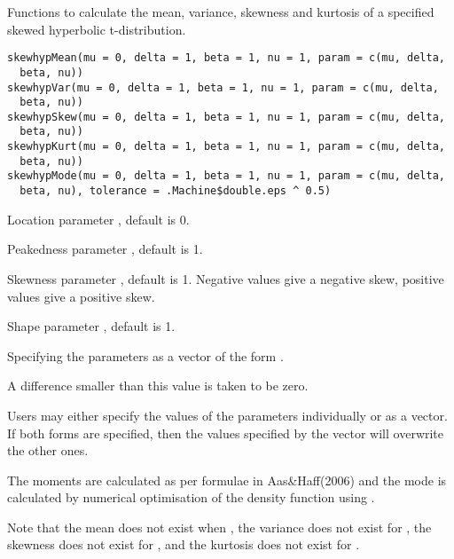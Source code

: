 \documentclass{book}
\begin{document}
\begin{Description}\relax
Functions to calculate the mean, variance, skewness and kurtosis of a
specified skewed hyperbolic t-distribution.
\end{Description}
\begin{Usage}
\begin{verbatim}
skewhypMean(mu = 0, delta = 1, beta = 1, nu = 1, param = c(mu, delta,
  beta, nu))
skewhypVar(mu = 0, delta = 1, beta = 1, nu = 1, param = c(mu, delta,
  beta, nu))
skewhypSkew(mu = 0, delta = 1, beta = 1, nu = 1, param = c(mu, delta,
  beta, nu))
skewhypKurt(mu = 0, delta = 1, beta = 1, nu = 1, param = c(mu, delta,
  beta, nu))
skewhypMode(mu = 0, delta = 1, beta = 1, nu = 1, param = c(mu, delta,
  beta, nu), tolerance = .Machine$double.eps ^ 0.5)
\end{verbatim}
\end{Usage}
\begin{Arguments}
\begin{ldescription}
\item[\code{mu}] Location parameter , default is 0.
\item[\code{delta}] Peakedness parameter , default is 1.
\item[\code{beta}] Skewness parameter , default is 1. Negative
values give a negative skew, positive values give a positive skew.
\item[\code{nu}] Shape parameter \eqn{\nu}{\nu}, default is 1.
\item[\code{param}] Specifying the parameters as a vector of the form
.
\item[\code{tolerance}] A difference smaller than this value is taken to be zero.
\end{ldescription}
\end{Arguments}
\begin{Details}\relax
Users may either specify the values of the parameters individually or
as a vector. If both forms are specified, then the values specified by
the vector  will overwrite the other ones.

The moments are calculated as per formulae in Aas\&Haff(2006) and the
mode is calculated by numerical optimisation of the density function
using .

Note that the mean does not exist when , the
variance does not exist for , the skewness does
not exist for , and the kurtosis does not exist
for .
\end{Details}
\end{document}
